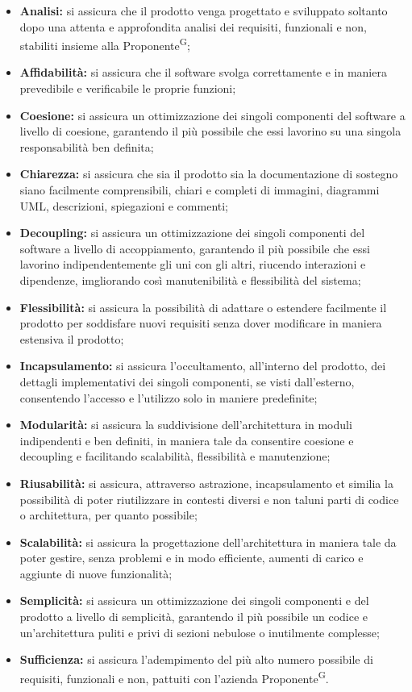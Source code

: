\documentclass[8pt]{article}
\newcommand{\glossterm}[1]{#1\textsuperscript{G}} %
\begin{document}
\begin{itemize}
    \item \textbf{Analisi:} si assicura che il prodotto venga progettato e sviluppato soltanto dopo una attenta e approfondita analisi dei requisiti, funzionali e non, stabiliti insieme alla \glossterm{Proponente}; 
    \item \textbf{Affidabilità:} si assicura che il software svolga correttamente e in maniera prevedibile e verificabile le proprie funzioni;
    \item \textbf{Coesione:} si assicura un ottimizzazione dei singoli componenti del software a livello di coesione, garantendo il più possibile che essi lavorino su una singola responsabilità ben definita;
    \item \textbf{Chiarezza:} si assicura che sia il prodotto sia la documentazione di sostegno siano facilmente comprensibili, chiari e completi di immagini, diagrammi UML, descrizioni, spiegazioni e commenti;
    \item \textbf{Decoupling:} si assicura un ottimizzazione dei singoli componenti del software a livello di accoppiamento, garantendo il più possibile che essi lavorino indipendentemente gli uni con gli altri, riucendo interazioni e dipendenze, imgliorando così manutenibilità e flessibilità del sistema;
    \item \textbf{Flessibilità:} si assicura la possibilità di adattare o estendere facilmente il prodotto per soddisfare nuovi requisiti senza dover modificare in maniera estensiva il prodotto;
    \item \textbf{Incapsulamento:} si assicura l'occultamento, all'interno del prodotto, dei dettagli implementativi dei singoli componenti, se visti dall'esterno, consentendo l'accesso e l'utilizzo solo in maniere predefinite;
    \item \textbf{Modularità:} si assicura la suddivisione dell'architettura in moduli indipendenti e ben definiti, in maniera tale da consentire coesione e decoupling e facilitando scalabilità, flessibilità e manutenzione;
    \item \textbf{Riusabilità:} si assicura, attraverso astrazione, incapsulamento et similia la possibilità di poter riutilizzare in contesti diversi e non taluni parti di codice o architettura, per quanto possibile;
    \item \textbf{Scalabilità:} si assicura la progettazione dell'architettura in maniera tale da poter gestire, senza problemi e in modo efficiente, aumenti di carico e aggiunte di nuove funzionalità;
    \item \textbf{Semplicità:} si assicura un ottimizzazione dei singoli componenti e del prodotto a livello di semplicità, garantendo il più possibile un codice e un'architettura puliti e privi di sezioni nebulose o inutilmente complesse;
    \item \textbf{Sufficienza:} si assicura l'adempimento del più alto numero possibile di requisiti, funzionali e non, pattuiti con l'azienda \glossterm{Proponente}.
\end{itemize}
\end{document}
